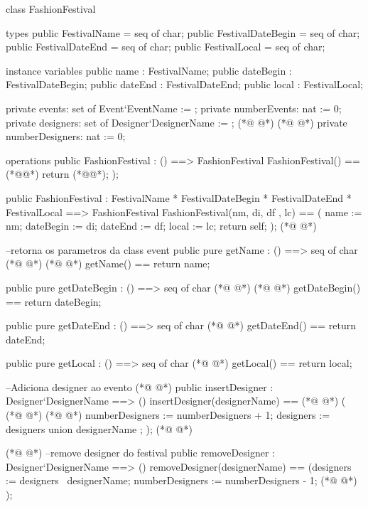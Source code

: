 \begin{vdmpp}[breaklines=true]
class FashionFestival
 
types
 public FestivalName = seq of char;
 public FestivalDateBegin = seq of char;
 public FestivalDateEnd = seq of char;
 public FestivalLocal = seq of char;
  
instance variables
 public name : FestivalName;
 public dateBegin : FestivalDateBegin;
 public dateEnd : FestivalDateEnd;
 public local : FestivalLocal;
 
 private events: set of Event`EventName := {};
 private numberEvents: nat := 0;
 private designers: set of Designer`DesignerName := {};
(*@
\label{ShowEvent:18}
@*)
(*@
\label{FashionFestival:18}
@*)
 private numberDesigners: nat := 0;
 

operations
public FashionFestival : () ==> FashionFestival
  FashionFestival() ==
  (*@\vdmnotcovered{(}@*)
    return (*@@*);
  );
  
  public FashionFestival : 
              FestivalName *
              FestivalDateBegin * 
              FestivalDateEnd *
              FestivalLocal            
              ==> FashionFestival
  FashionFestival(nm, di, df , lc) ==
  (
    name := nm;
    dateBegin := di;
    dateEnd := df;
    local := lc;    
    return self;
  );
(*@
\label{getName:42}
@*)
  
  --retorna os parametros da class event
  public pure getName : () ==> seq of char
(*@
\label{getDateBegin:45}
@*)
(*@
\label{getDate:45}
@*)
    getName() == return name;
    
   public pure getDateBegin : () ==> seq of char
(*@
\label{getDateEnd:48}
@*)
(*@
\label{getLocal:48}
@*)
     getDateBegin() == return dateBegin;
  
  public pure getDateEnd : () ==> seq of char
(*@
\label{getTime:51}
@*)
     getDateEnd() == return dateEnd;
     
  public pure getLocal : () ==> seq of char
(*@
\label{getDuration:54}
@*)
     getLocal() == return local;
  
 --Adiciona designer ao evento
(*@
\label{getTheme:57}
@*)
 public insertDesigner : Designer`DesignerName ==> ()
  insertDesigner(designerName) ==
(*@
\label{insertDesigner:59}
@*)
  (
(*@
\label{getGender:60}
@*)
(*@
\label{removeDesigner:60}
@*)
    numberDesigners := numberDesigners + 1;
    designers := designers union { designerName };
  );
(*@
\label{getColection:63}
@*)
  
(*@
\label{getNumberDesigners:64}
@*)
  --remove designer do festival
  public removeDesigner : Designer`DesignerName ==> ()
  removeDesigner(designerName) == 
  (designers := designers \ {designerName};
  numberDesigners := numberDesigners - 1;
(*@
\label{removeEvent:69}
@*)
  );


\end{vdmpp}
